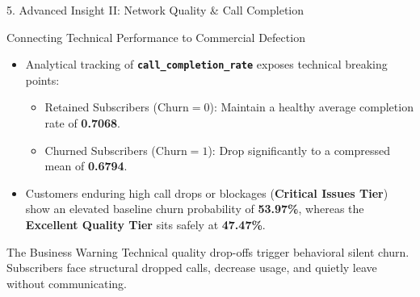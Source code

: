 \documentclass[10pt,aspectratio=169]{beamer}
\begin{document}
\begin{frame}{5. Advanced Insight II: Network Quality \& Call Completion}
  \begin{block}{Connecting Technical Performance to Commercial Defection}
    \begin{itemize}
      \item Analytical tracking of \textbf{\texttt{call\_completion\_rate}} exposes technical breaking points:
      \begin{itemize}
        \item Retained Subscribers ($\text{Churn}=0$): Maintain a healthy average completion rate of \textbf{0.7068}.
        \item Churned Subscribers ($\text{Churn}=1$): Drop significantly to a compressed mean of \textbf{0.6794}.
      \end{itemize}
      \item Customers enduring high call drops or blockages (\textbf{Critical Issues Tier}) show an elevated baseline churn probability of \alert{\textbf{53.97\%}}, whereas the \textbf{Excellent Quality Tier} sits safely at \textbf{47.47\%}.
    \end{itemize}
  \end{block}
  \begin{exampleblock}{The Business Warning}
    Technical quality drop-offs trigger behavioral silent churn. Subscribers face structural dropped calls, decrease usage, and quietly leave without communicating.
  \end{exampleblock}
\end{frame}
\end{document}
